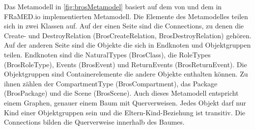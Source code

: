 Das Metamodell in \cref{fig:brosMetamodel} basiert auf dem von \cite{Schoen} und dem in FRaMED.io implementierten Metamodell.
Die Elemente des Metamodelles teilen sich in zwei Klassen auf.
Auf der einen Seite sind die Connections, zu denen die Create- und DestroyRelation (BrosCreateRelation, BrosDestroyRelation) gehören.
Auf der anderen Seite sind die Objekte die sich in Endknoten und Objektgruppen teilen.
Endknoten sind die NaturalTypes (BrosClass), die RoleTypes (BrosRoleType), Events (BrosEvent) und ReturnEvents (BrosReturnEvent).
Die Objektgruppen sind Containerelemente die andere Objekte enthalten können.
Zu ihnen zählen der CompartmentType (BrosCompartment), das Package (BrosPackage) und die Scene (BrosScene).
Auch dieses Metamodell entspricht einem Graphen, genauer einem Baum mit Querverweisen.
Jedes Objekt darf nur Kind einer Objektgruppen sein und die Eltern-Kind-Beziehung ist transitiv.
Die Connections bilden die Querverweise innerhalb des Baumes.
